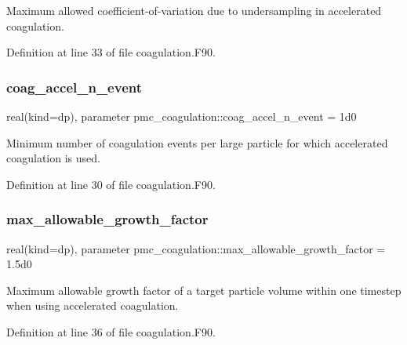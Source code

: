 Maximum allowed coefficient-\/of-\/variation due to undersampling in accelerated coagulation. 



Definition at line 33 of file coagulation.\+F90.

\mbox{\label{namespacepmc__coagulation_ae04bc0968f517899ce26a23b550181f5}} 
\subsubsection{\texorpdfstring{coag\+\_\+accel\+\_\+n\+\_\+event}{coag\_accel\_n\_event}}
{\footnotesize\ttfamily real(kind=dp), parameter pmc\+\_\+coagulation\+::coag\+\_\+accel\+\_\+n\+\_\+event = 1d0}



Minimum number of coagulation events per large particle for which accelerated coagulation is used. 



Definition at line 30 of file coagulation.\+F90.

\mbox{\label{namespacepmc__coagulation_a56c874842d78c24cc24a82623569418e}} 
\subsubsection{\texorpdfstring{max\+\_\+allowable\+\_\+growth\+\_\+factor}{max\_allowable\_growth\_factor}}
{\footnotesize\ttfamily real(kind=dp), parameter pmc\+\_\+coagulation\+::max\+\_\+allowable\+\_\+growth\+\_\+factor = 1.\+5d0}



Maximum allowable growth factor of a target particle volume within one timestep when using accelerated coagulation. 



Definition at line 36 of file coagulation.\+F90.

